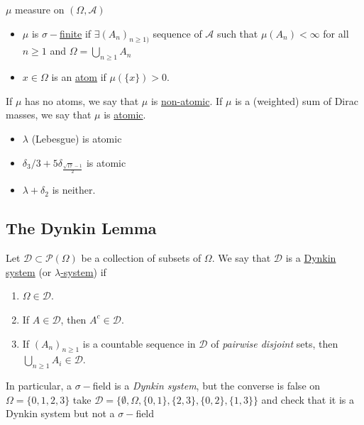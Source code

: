 \documentclass{scrartcl}
\begin{document}
  \begin{notation}
    $\mu$ measure on $(\Omega, \mathcal{A})$
    \begin{itemize}
      \item $\mu$ is \underline{$\sigma-$finite} if $\exists (A_n)_{n \geq 1)}$ sequence of $\mathcal{A}$
        such that $\mu(A_n) < \infty$ for all $n \geq 1$ and $\Omega = \bigcup_{n \geq 1} A_n$
      \item $x \in \Omega$ is an \underline{atom} if $\mu(\{ x \} ) > 0$.
    \end{itemize}
  \end{notation}

  If $\mu$ has no atoms, we say that $\mu$ is \underline{non-atomic}. If $\mu$ is a (weighted)
  sum of Dirac masses, we say that $\mu$ is \underline{atomic}.

  \begin{example}
  \begin{itemize}

    \item $\lambda$ (Lebesgue) is atomic
    \item $\delta_3 / 3 + 5 \delta_{\frac{\sqrt{17} - 1}{2}}$ is atomic
    \item $\lambda + \delta_2$ is neither.
  \end{itemize}
  \end{example}

  \subsection{The Dynkin Lemma}
  \begin{definition}
    Let $\mathcal{D} \subset \mathcal{P}(\Omega)$ be a collection of subsets of $\Omega$. We
    say that $\mathcal{D}$ is a \underline{Dynkin system} (or \underline{$\lambda$-system}) if
    \begin{enumerate}
      \item $\Omega \in \mathcal{D}$.
      \item If $A \in \mathcal{D}$, then $A^c \in \mathcal{D}$.
      \item If $(A_n)_{n \geq 1}$ is a countable sequence in $\mathcal{D}$ of \textit{pairwise
        disjoint} sets, then $\bigcup_{n \geq 1} A_i \in \mathcal{D}$.
    \end{enumerate}
  \end{definition}
  In particular, a $\sigma-$field is a \textit{Dynkin system}, but the converse is false on
  $\Omega = \{ 0,1,2,3\} $ take $\mathcal{D} = \{ \emptyset, \Omega, \{ 0,1 \}, \{ 2,3 \} , \{
  0,2\} , \{ 1,3 \}  \} $ and check that it is a Dynkin system but not a $\sigma-$field
\end{document}
